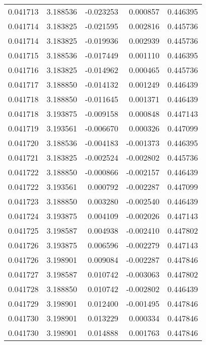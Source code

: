 \begin{tabular}{lrrrr}
0.041713    &  3.188536 & -0.023253 &  0.000857 &             0.446395 \\
0.041714    &  3.183825 & -0.021595 &  0.002816 &             0.445736 \\
0.041714    &  3.183825 & -0.019936 &  0.002939 &             0.445736 \\
0.041715    &  3.188536 & -0.017449 &  0.001110 &             0.446395 \\
0.041716    &  3.183825 & -0.014962 &  0.000465 &             0.445736 \\
0.041717    &  3.188850 & -0.014132 &  0.001249 &             0.446439 \\
0.041718    &  3.188850 & -0.011645 &  0.001371 &             0.446439 \\
0.041718    &  3.193875 & -0.009158 &  0.000848 &             0.447143 \\
0.041719    &  3.193561 & -0.006670 &  0.000326 &             0.447099 \\
0.041720    &  3.188536 & -0.004183 & -0.001373 &             0.446395 \\
0.041721    &  3.183825 & -0.002524 & -0.002802 &             0.445736 \\
0.041722    &  3.188850 & -0.000866 & -0.002157 &             0.446439 \\
0.041722    &  3.193561 &  0.000792 & -0.002287 &             0.447099 \\
0.041723    &  3.188850 &  0.003280 & -0.002540 &             0.446439 \\
0.041724    &  3.193875 &  0.004109 & -0.002026 &             0.447143 \\
0.041725    &  3.198587 &  0.004938 & -0.002410 &             0.447802 \\
0.041726    &  3.193875 &  0.006596 & -0.002279 &             0.447143 \\
0.041726    &  3.198901 &  0.009084 & -0.002287 &             0.447846 \\
0.041727    &  3.198587 &  0.010742 & -0.003063 &             0.447802 \\
0.041728    &  3.188850 &  0.010742 & -0.002802 &             0.446439 \\
0.041729    &  3.198901 &  0.012400 & -0.001495 &             0.447846 \\
0.041730    &  3.198901 &  0.013229 &  0.000334 &             0.447846 \\
0.041730    &  3.198901 &  0.014888 &  0.001763 &             0.447846 \\

\end{tabular}
